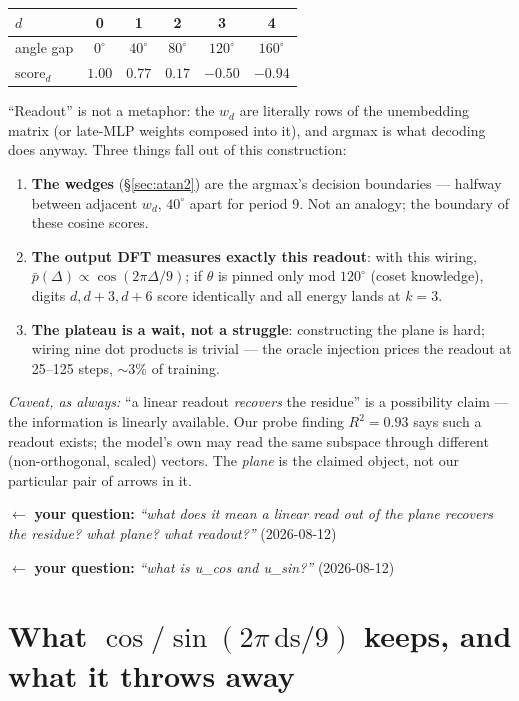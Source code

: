 \documentclass[11pt]{article}
\newcommand{\yourq}[2]{%
  \par\vspace{4pt}\noindent
  \textcolor{qcol}{$\leftarrow$ \textbf{your question:}
  \textit{``#1''}\; \textnormal{(#2)}}\par\vspace{4pt}}
\newcommand{\ds}{\mathrm{ds}}
\begin{document}
\begin{center}
\begin{tabular}{@{}lccccc@{}}
\toprule
$d$ & 0 & 1 & 2 & 3 & 4 \\
\midrule
angle gap & $0^\circ$ & $40^\circ$ & $80^\circ$ & $120^\circ$ & $160^\circ$ \\
$\text{score}_d$ & $\mathbf{1.00}$ & $0.77$ & $0.17$ & $-0.50$ & $-0.94$ \\
\bottomrule
\end{tabular}
\end{center}

``Readout'' is not a metaphor: the $w_d$ are literally rows of the unembedding
matrix (or late-MLP weights composed into it), and argmax is what decoding does
anyway. Three things fall out of this construction:
\begin{enumerate}[leftmargin=*,itemsep=1pt]
\item \textbf{The wedges} (\S\ref{sec:atan2}) are the argmax's decision
boundaries --- halfway between adjacent $w_d$, $40^\circ$ apart for period 9.
Not an analogy; the boundary of these cosine scores.
\item \textbf{The output DFT measures exactly this readout}: with this wiring,
$\bar{p}(\Delta) \propto \cos(2\pi\Delta/9)$; if $\theta$ is pinned only mod
$120^\circ$ (coset knowledge), digits $d, d{+}3, d{+}6$ score identically and all
energy lands at $k=3$.
\item \textbf{The plateau is a wait, not a struggle}: constructing the plane is
hard; wiring nine dot products is trivial --- the oracle injection prices the
readout at 25--125 steps, $\sim$3\% of training.
\end{enumerate}

\emph{Caveat, as always:} ``a linear readout \emph{recovers} the residue'' is a
possibility claim --- the information is linearly available. Our probe finding
$R^2 = 0.93$ says such a readout exists; the model's own may read the same
subspace through different (non-orthogonal, scaled) vectors. The \emph{plane} is
the claimed object, not our particular pair of arrows in it.

\yourq{what does it mean a linear read out of the plane recovers the residue?
what plane? what readout?}{2026-08-12}
\yourq{what is u\_cos and u\_sin?}{2026-08-12}

\section{What $\cos/\sin(2\pi\,\ds/9)$ keeps, and what it throws away}
\label{sec:keeps}
\end{document}
